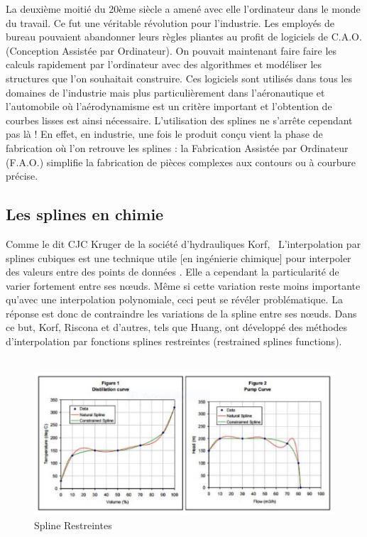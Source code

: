 \documentclass{article}
\begin{document}
La deuxi\`eme moiti\'{e} du 20\`eme si\`ecle a amen\'{e} avec elle l'ordinateur dans le monde du travail. Ce fut une v\'{e}ritable r\'{e}volution pour l'industrie. Les employ\'{e}s de bureau pouvaient abandonner leurs r\`egles pliantes au profit de logiciels de C.A.O. (Conception Assist\'{e}e par Ordinateur). On pouvait maintenant faire faire les calculs rapidement par l'ordinateur avec des algorithmes et mod\'{e}liser les structures que l'on souhaitait construire. Ces logiciels sont utilis\'{e}s dans tous les domaines de l'industrie mais plus particuli\`erement dans l'a\'{e}ronautique et l'automobile o\`u l'a\'{e}rodynamisme est un crit\`ere important et l'obtention de courbes lisses est ainsi n\'{e}cessaire. L'utilisation des splines ne s'arr\^ete cependant pas l\`a ! En effet, en industrie, une fois le produit con\c cu vient la phase de fabrication o\`u l'on retrouve les splines : la Fabrication Assist\'{e}e par Ordinateur (F.A.O.) simplifie la fabrication de pi\`eces complexes aux contours ou \`a courbure pr\'{e}cise.

\begin{huge}
\subsection{Les splines en chimie}
\end{huge}

Comme le dit CJC Kruger de la soci\'{e}t\'{e} d'hydrauliques Korf, \guillemotleft \ L'interpolation par splines cubiques est une technique utile [en ing\'{e}nierie chimique] pour interpoler des valeurs entre des points de donn\'{e}es  \guillemotright. Elle a cependant la particularit\'{e} de varier fortement entre ses n\oe uds. M\^{e}me si cette variation reste moins importante qu'avec une interpolation polynomiale, ceci peut se r\'{e}v\'{e}ler probl\'{e}matique. La r\'{e}ponse est donc de contraindre les variations de la spline entre ses n\oe uds. Dans ce but, Korf, Riscona et d'autres, tels que Huang, ont d\'{e}velopp\'{e} des m\'{e}thodes d'interpolation par fonctions splines restreintes (restrained splines functions).\\\\

\begin{figure}[h]
	\centering
	\includegraphics[width=12cm]{SplineChimie.png}
	\caption{Spline Restreintes}
\end{figure}
\end{document}
